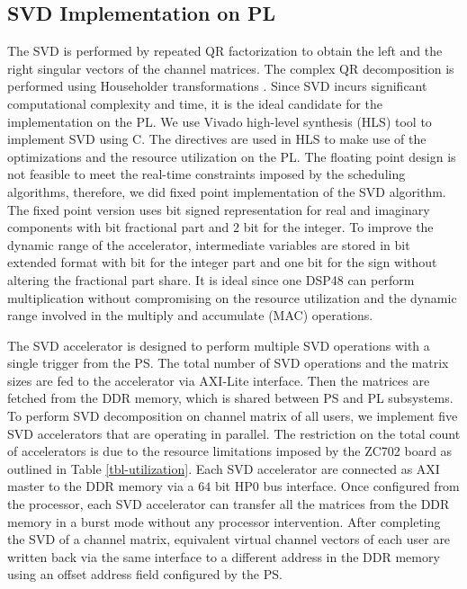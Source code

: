 \documentclass[conference,letterpaper,10pt]{./../../IEEE/IEEEtran}
\begin{document}
\subsection{SVD Implementation on PL}
The SVD is performed by repeated QR factorization to obtain the left and the right singular vectors of the channel matrices. The complex QR decomposition is performed using Householder transformations \cite{aft}. Since SVD incurs significant computational complexity and time, it is the ideal candidate for the implementation on the PL. We use Vivado high-level synthesis (HLS) tool to implement SVD using C. The directives are used in HLS to make use of the optimizations and the resource utilization on the PL. The floating point design is not feasible to meet the real-time constraints imposed by the scheduling algorithms, therefore, we did fixed point implementation of the SVD algorithm. The fixed point version uses  bit signed representation for real and imaginary components with  bit fractional part and $2$ bit for the integer. To improve the dynamic range of the accelerator, intermediate variables are stored in  bit extended format with  bit for the integer part and one bit for the sign without altering the fractional part share. It is ideal since one DSP48 \cite{zynq} can perform  multiplication without compromising on the resource utilization and the dynamic range involved in the multiply and accumulate (MAC) operations. 

The SVD accelerator is designed to perform multiple SVD operations with a single trigger from the PS. The total number of SVD operations and the matrix sizes are fed to the accelerator via AXI-Lite interface. Then the matrices are fetched from the DDR memory, which is shared between PS and PL subsystems. To perform SVD decomposition on channel matrix of all users, we implement five SVD accelerators that are operating in parallel. The restriction on the total count of accelerators is due to the resource limitations imposed by the ZC702 board as outlined in Table \ref{tbl-utilization}.
Each SVD accelerator are connected as AXI master to the DDR memory via a $64$ bit HP$0$ bus interface. Once configured from the processor, each SVD accelerator can transfer all the matrices from the DDR memory in a burst mode without any processor intervention. After completing the SVD of a channel matrix, equivalent virtual channel vectors of each user are written back via the same interface to a different address in the DDR memory using an offset address field configured by the PS.
\end{document}
